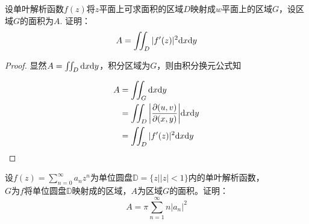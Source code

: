 \begin{proposition}
    
    设单叶解析函数$f(z)$将$z$平面上可求面积的区域$D$映射成$w$平面上的区域$G$，设区域$G$的面积为$A$. 证明：
    $$ A = \iint_{D}{|f'(z)|^2}\mathrm{d} x\mathrm{d} y$$

\end{proposition}

\begin{proof}
    
    显然$A = \iint_{D}\mathrm{d} x\mathrm{d} y$，积分区域为$G$，则由积分换元公式知

    \begin{align*}
        A & = \iint_{G}\mathrm{d} x\mathrm{d} y \\
          & = \iint_{D}{\left| \dfrac{\partial(u, v)}{\partial(x, y)} \right|}\mathrm{d} x\mathrm{d} y \\
          & = \iint_{D}{|f'(z)|^2}\mathrm{d} x\mathrm{d} y
    \end{align*}

\end{proof}

\begin{proposition}
    
    设$f(z) = \sum\limits_{n = 0}^{\infty}{a_nz^n}$为单位圆盘$\mathbb{D} = \{z\big| |z| < 1\}$内的单叶解析函数，\\
    $G$为$f$将单位圆盘$\mathbb{D}$映射成的区域，$A$为区域$G$的面积。证明：
    $$A =  \pi\sum\limits_{n = 1}^{\infty}{n|a_n|^2}$$

\end{proposition}

